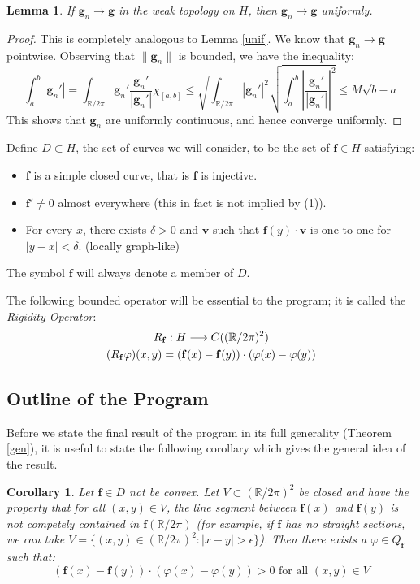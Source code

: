 \documentclass{amsart}
\newcommand{\R}			{\mathbb R}
\newcommand{\f}			{\mathbf f}
\newcommand{\g}			{\mathbf g}
\newcommand{\vv}		{\mathbf v}
\newcommand{\map}		{\longrightarrow}
\newtheorem{lemma}[theorem]{Lemma}
\newtheorem{corollary}[theorem]{Corollary}
\numberwithin{equation}{section}
\begin{document}
\begin{lemma}\label{unif2}
If $\g_n\to\g$ in the weak topology on $H$, then 
$\g_n\to\g$ uniformly.
\end{lemma}

\begin{proof}
This is completely analogous to Lemma \ref{unif}.  We know that 
$\g_n\to\g$ pointwise.  Observing that $\|\g_n\|$ is bounded, we 
have the inequality:
\begin{equation}
\int_a^b|\g_n'|=\int_{\R/2\pi}\g_n'\frac{\g_n'}{|\g_n'|}\chi_{[a,b]}\leq
\sqrt{\int_{\R/2\pi}|\g_n'|^2}\sqrt{\int_a^b\left|\frac{\g_n'}{|\g_n'|}\right|^2}
\leq M\sqrt{b-a}
\end{equation}
This shows that $\g_n$ are uniformly continuous, and hence 
converge uniformly.
\end{proof}

Define $D\subset H$, the set of curves we will consider, 
to be the set of $\f\in H$ satisfying:
\begin{itemize}
\item[(1)] $\f$ is a simple closed curve, that is $\f$ is injective.
\item[(2)] $\f'\ne 0$ almost everywhere (this in fact is not implied by (1)).
\item[(3)] For every $x$, there exists $\delta>0$ and $\vv$ 
such that $\f(y)\cdot\vv$ is one to one for $|y-x|<\delta$. (locally graph-like)
\end{itemize}
The symbol $\f$ will always denote a member of $D$.

The following bounded operator will be essential 
to the program; it is called the {\it Rigidity 
Operator}:
\begin{gather}
R_\f:H\map C((\R/2\pi)^2)\cr
(R_\f\varphi)(x,y)=(\f(x)-\f(y))\cdot(\varphi(x)-\varphi(y))
\end{gather}

\subsection{Outline of the Program}

Before we state the final result of the program in its full 
generality (Theorem \ref{gen}), it is useful to state the 
following corollary which gives the general idea of the result.

\begin{corollary}\label{cgen}
Let $\f\in D$ not be convex.  Let $V\subset(\R/2\pi)^2$ be 
closed and have the property that for all $(x,y)\in V$, 
the line segment between $\f(x)$ and $\f(y)$ is not competely 
contained in $\f(\R/2\pi)$ (for example, if $\f$ has no 
straight sections, we can take $V=\{(x,y)\in(\R/2\pi)^2:|x-y|>\epsilon\}$).  
Then there exists a $\varphi\in Q_\f$ such that:
\begin{equation}\label{expan}
(\f(x)-\f(y))\cdot(\varphi(x)-\varphi(y))>0\text{ for all $(x,y)\in V$}
\end{equation}
\end{corollary}
\end{document}
